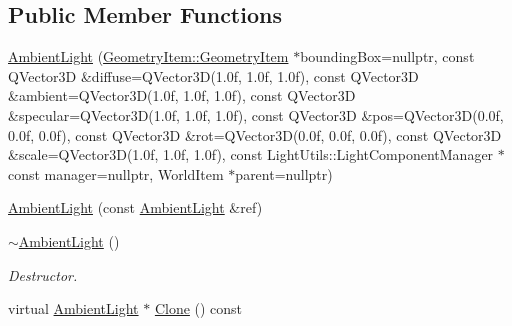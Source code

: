 \subsection*{Public Member Functions}
\begin{DoxyCompactItemize}
\item 
\mbox{\hyperlink{class_geometry_engine_1_1_geometry_world_item_1_1_geometry_light_1_1_ambient_light_a650db3630a679fb479200fc881efe25e}{Ambient\+Light}} (\mbox{\hyperlink{class_geometry_engine_1_1_geometry_world_item_1_1_geometry_item_1_1_geometry_item}{Geometry\+Item\+::\+Geometry\+Item}} $\ast$bounding\+Box=nullptr, const Q\+Vector3D \&diffuse=Q\+Vector3D(1.\+0f, 1.\+0f, 1.\+0f), const Q\+Vector3\+D \&ambient=\+Q\+Vector3\+D(1.\+0f, 1.\+0f, 1.\+0f), const Q\+Vector3\+D \&specular=\+Q\+Vector3\+D(1.\+0f, 1.\+0f, 1.\+0f), const Q\+Vector3\+D \&pos=\+Q\+Vector3\+D(0.\+0f, 0.\+0f, 0.\+0f), const Q\+Vector3\+D \&rot=\+Q\+Vector3\+D(0.\+0f, 0.\+0f, 0.\+0f), const Q\+Vector3\+D \&scale=\+Q\+Vector3\+D(1.\+0f, 1.\+0f, 1.\+0f), const Light\+Utils\+::\+Light\+Component\+Manager $\ast$const manager=nullptr, World\+Item $\ast$parent=nullptr)
\item 
\mbox{\hyperlink{class_geometry_engine_1_1_geometry_world_item_1_1_geometry_light_1_1_ambient_light_a7fd9257e58a7e3d41561f95f7bb383bf}{Ambient\+Light}} (const \mbox{\hyperlink{class_geometry_engine_1_1_geometry_world_item_1_1_geometry_light_1_1_ambient_light}{Ambient\+Light}} \&ref)
\item 
\mbox{\label{class_geometry_engine_1_1_geometry_world_item_1_1_geometry_light_1_1_ambient_light_ab60967e98b1d6931e49519fddb1b69af}} 
\mbox{\hyperlink{class_geometry_engine_1_1_geometry_world_item_1_1_geometry_light_1_1_ambient_light_ab60967e98b1d6931e49519fddb1b69af}{$\sim$\+Ambient\+Light}} ()
\begin{DoxyCompactList}\small\item\em Destructor. \end{DoxyCompactList}\item 
virtual \mbox{\hyperlink{class_geometry_engine_1_1_geometry_world_item_1_1_geometry_light_1_1_ambient_light}{Ambient\+Light}} $\ast$ \mbox{\hyperlink{class_geometry_engine_1_1_geometry_world_item_1_1_geometry_light_1_1_ambient_light_a890a2ff8ce5cde88cdc51b4e598ca9af}{Clone}} () const
\end{DoxyCompactItemize}
